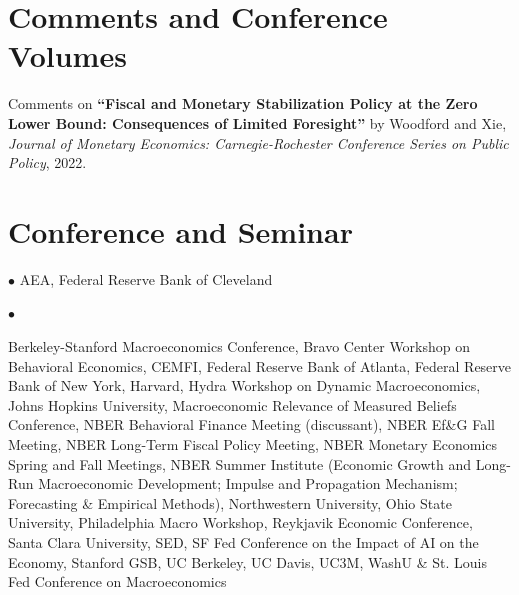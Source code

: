 \documentclass[line]{res}
\newenvironment{list1}{
  \begin{list}{\ding{113}}{%
      \setlength{\itemsep}{0.07in}
      \setlength{\parsep}{0in} \setlength{\parskip}{0in}
		\setlength{\topsep}{0.07in} \setlength{\partopsep}{0in}
      \setlength{\leftmargin}{0.0in}}}{\end{list}}
\newenvironment{list2}{
  \begin{list}{$\bullet$}{%
      \setlength{\itemsep}{0in}
      \setlength{\parsep}{0in} \setlength{\parskip}{0in}
      \setlength{\topsep}{0in} \setlength{\partopsep}{0in} 
      \setlength{\leftmargin}{0in}}}{\end{list}}
\begin{document}
\begin{resume}
\section{\sc Comments and Conference Volumes}
\begin{list1}
\item[] Comments on \textbf{“Fiscal and Monetary Stabilization Policy at the Zero Lower Bound: Consequences of Limited Foresight”} by Woodford and Xie, \emph{Journal of Monetary Economics: Carnegie-Rochester Conference Series on Public Policy}, 2022.
\end{list1}


\section{\sc Conference and Seminar}

\begin{list1}

\item [2027]
\begin{list2}
   AEA, Federal Reserve Bank of Cleveland
\end{list2}


\item [2026]
\begin{list2}
\item[] Berkeley-Stanford Macroeconomics Conference, Bravo Center Workshop on Behavioral Economics, CEMFI, Federal Reserve Bank of Atlanta, Federal Reserve Bank of New York, Harvard, Hydra Workshop on Dynamic Macroeconomics, Johns Hopkins University, Macroeconomic Relevance of Measured Beliefs Conference, NBER Behavioral Finance Meeting (discussant), NBER Ef\&G Fall Meeting, NBER Long-Term Fiscal Policy Meeting, NBER Monetary Economics Spring and Fall Meetings, NBER Summer Institute (Economic Growth and Long-Run Macroeconomic Development; Impulse and Propagation Mechanism; Forecasting \& Empirical Methods), Northwestern University, Ohio State University, Philadelphia Macro Workshop, Reykjavik Economic Conference, Santa Clara University, SED, SF Fed Conference on the Impact of AI on the Economy, Stanford GSB, UC Berkeley, UC Davis, UC3M, WashU \& St. Louis Fed Conference on Macroeconomics
\end{list2}


\end{list1}
\end{resume}
\end{document}
